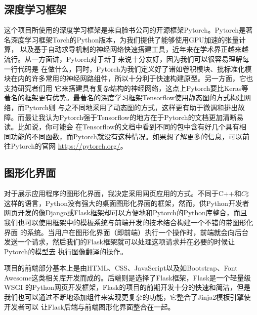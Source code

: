 \documentclass[supercite]{HustGraduPaper}
\theoremstyle{definition}
\begin{document}
\subsection{深度学习框架}

这个项目所使用的深度学习框架是来自脸书公司的开源框架Pytorch。Pytorch是著名深度学习框架Torch的Python版本，为我们提供了能够使用GPU加速的张量计算，
以及基于自动求导机制的神经网络快速搭建工具，近年来在学术界正越来越流行。从一方面讲，Pytorch对于新手来说十分友好，因为我们可以很容易理解每一行代码是
在做什么，同时，Pytorch为我们定义好了诸如卷积模块、批标准化模块在内的许多常用的神经网路组件，所以十分利于快速构建原型。另一方面，它也支持研究者们用
它来搭建具有复杂结构的神经网络，这点上Pytorch要比Keras等著名的框架更有优势。最著名的深度学习框架Tensorflow使用静态图的方式构建网络，而Pytorch则
与之不同地采用了动态图的方式，这样更有助于微调和排出故障。而最让我认为Pytorch强于Tensorflow的地方在于Pytorch的文档更加清晰易读。比如说，你可能会
在Tensorflow的文档中看到不同的包中含有好几个具有相同功能的不同函数，而Pytorch就没有这种情况。如果想了解更多的信息，可以前往Pytorch的官网
\href{https://pytorch.org/}{https://pytorch.org/}。

\subsection{图形化界面}

对于展示应用程序的图形化界面，我决定采用网页应用的方式。不同于C++和$C\sharp$这样的语言，Python没有强大的桌面图形化界面的框架，然而，供Python开发者
网页开发的像Django或Flask框架却可以方便地和Pytorch的Python库整合，而且我们也可以使用框架中的模板系统与前端开发的技术结合构建一个不错的带图形化界面
的系统。当用户在图形化界面（即前端）执行一个操作时，前端就会向后台发送一个请求，然后我们的Flask框架就可以处理这项请求并在必要的时候让Pytorch的模型去
执行图像翻译的操作。

项目的前端部分基本上是由HTML、CSS、JavaScript以及如Bootstrap、Font Awesome这类相关库开发而成的。后端则是选择了Flask框架，Flask是一个轻量级WSGI
的Python网页开发框架，Flask的项目的前期开发十分的快速和简洁，但是我们也可以通过不断地添加组件来实现更复杂的功能，它整合了Jinja2模板引擎使开发者可以
让Flask后端与前端图形化界面整合在一起。
\end{document}
